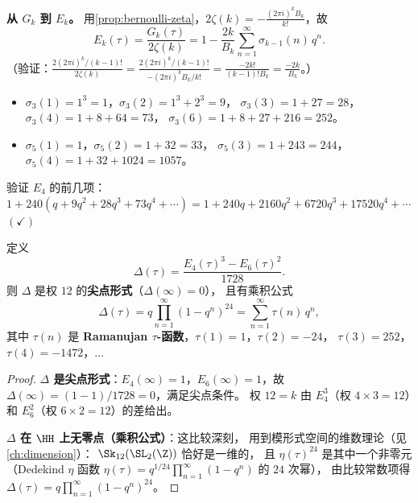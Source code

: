 \textbf{从 $G_k$ 到 $E_k$。}
用\cref{prop:bernoulli-zeta}，$2\zeta(k) = -\frac{(2\pi i)^k B_k}{k!}$，故
\[
  E_k(\tau)
  = \frac{G_k(\tau)}{2\zeta(k)}
  = 1 - \frac{2k}{B_k} \sum_{n=1}^{\infty} \sigma_{k-1}(n)\, q^n.
\]
（验证：$\frac{2(2\pi i)^k/(k-1)!}{2\zeta(k)} = \frac{2(2\pi i)^k/(k-1)!}{-(2\pi i)^k B_k/k!}
= \frac{-2k!}{(k-1)! B_k} = \frac{-2k}{B_k}$。）

\begin{example}
\label{ex:sigma-computation}
\leavevmode
\begin{itemize}
  \item $\sigma_3(1) = 1^3 = 1$，$\sigma_3(2) = 1^3 + 2^3 = 9$，
    $\sigma_3(3) = 1 + 27 = 28$，$\sigma_3(4) = 1 + 8 + 64 = 73$，
    $\sigma_3(6) = 1 + 8 + 27 + 216 = 252$。
  \item $\sigma_5(1) = 1$，$\sigma_5(2) = 1 + 32 = 33$，
    $\sigma_5(3) = 1 + 243 = 244$，$\sigma_5(4) = 1 + 32 + 1024 = 1057$。
\end{itemize}

验证 $E_4$ 的前几项：
$1 + 240(q + 9q^2 + 28q^3 + 73q^4 + \cdots)
= 1 + 240q + 2160q^2 + 6720q^3 + 17520q^4 + \cdots$ \quad $(\checkmark)$
\end{example}

\begin{proposition}[$E_4, E_6$ 与 $\Delta$]
\label{prop:E4-E6-Delta}
定义
\[
  \Delta(\tau) = \frac{E_4(\tau)^3 - E_6(\tau)^2}{1728}.
\]
则 $\Delta$ 是权 $12$ 的\textbf{尖点形式}（$\Delta(\infty) = 0$），
且有乘积公式
\[
  \Delta(\tau) = q \prod_{n=1}^{\infty}(1-q^n)^{24}
  = \sum_{n=1}^{\infty} \tau(n)\, q^n,
\]
其中 $\tau(n)$ 是 \textbf{Ramanujan $\tau$-函数}，$\tau(1) = 1$，$\tau(2) = -24$，
$\tau(3) = 252$，$\tau(4) = -1472$，$\ldots$
\end{proposition}

\begin{proof}
\textbf{$\Delta$ 是尖点形式}：$E_4(\infty) = 1$，$E_6(\infty) = 1$，故
$\Delta(\infty) = (1 - 1)/1728 = 0$，满足尖点条件。
权 $12 = k$ 由 $E_4^3$（权 $4 \times 3 = 12$）和 $E_6^2$（权 $6 \times 2 = 12$）的差给出。

\textbf{$\Delta$ 在 $\HH$ 上无零点（乘积公式）}：这比较深刻，
用到模形式空间的维数理论（见\cref{ch:dimension}）：
$\Sk_{12}(\SL_2(\Z))$ 恰好是一维的，
且 $\eta(\tau)^{24}$ 是其中一个非零元（Dedekind $\eta$ 函数
$\eta(\tau) = q^{1/24}\prod_{n=1}^\infty(1-q^n)$ 的 $24$ 次幂），
由比较常数项得 $\Delta(\tau) = q\prod_{n=1}^\infty(1-q^n)^{24}$。
\end{proof}

